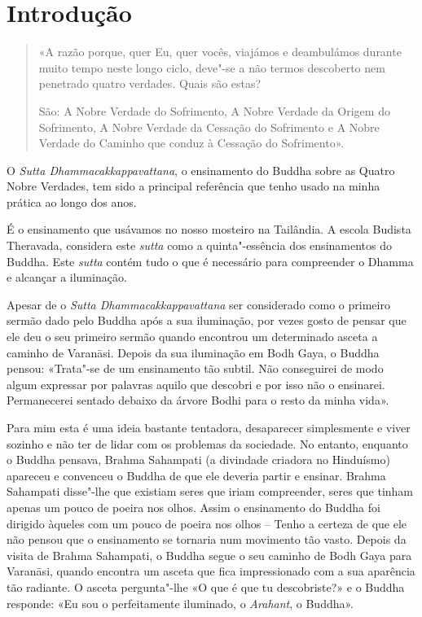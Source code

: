 \chapter{Introdução}

\thispagestyle{bottomcenter}

\begin{quote}
  «A razão porque, quer Eu, quer vocês, viajámos e deambulámos durante muito
  tempo neste longo ciclo, deve"-se a não termos descoberto nem penetrado quatro
  verdades. Quais são estas?

  São: A Nobre Verdade do Sofrimento, A Nobre Verdade da Origem do Sofrimento, A
  Nobre Verdade da Cessação do Sofrimento e A Nobre Verdade do Caminho que conduz
  à Cessação do Sofrimento».

\end{quote}

\noindent
O \emph{Sutta Dhammacakkappavattana}, o ensinamento do Buddha sobre as Quatro
Nobre Verdades, tem sido a principal referência que tenho usado na minha prática
ao longo dos anos.

\enlargethispage{\baselineskip}

É o ensinamento que usávamos no nosso mosteiro na Tailândia.
A escola Budista Theravada, considera este \emph{sutta} como a quinta"-essência
dos ensinamentos do Buddha. Este \emph{sutta} contém tudo o que é necessário
para compreender o Dhamma e alcançar a iluminação.

Apesar de o \emph{Sutta Dhammacakkappavattana} ser considerado como o primeiro
sermão dado pelo Buddha após a sua iluminação, por vezes gosto de pensar que ele
deu o seu primeiro sermão quando encontrou um determinado asceta a caminho de Varanāsi.
Depois da sua iluminação em Bodh Gaya, o Buddha pensou: «Trata"-se de um
ensinamento tão subtil. Não conseguirei de modo algum expressar por palavras
aquilo que descobri e por isso não o ensinarei. Permanecerei sentado debaixo da
árvore Bodhi para o resto da minha vida».

Para mim esta é uma ideia bastante tentadora, desaparecer simplesmente e viver
sozinho e não ter de lidar com os problemas da sociedade. No entanto, enquanto o
Buddha pensava, Brahma Sahampati (a divindade criadora no Hinduísmo) apareceu e
convenceu o Buddha de que ele deveria partir e ensinar. Brahma Sahampati
disse"-lhe que existiam seres que iriam compreender, seres que tinham apenas um pouco
de poeira nos olhos. Assim o ensinamento do Buddha foi dirigido àqueles com um
pouco de poeira nos olhos – Tenho a certeza de que ele não pensou que o
ensinamento se tornaria num movimento tão vasto.
Depois da visita de Brahma Sahampati, o Buddha segue o seu caminho de Bodh Gaya
para Varanāsi, quando encontra um asceta que fica impressionado com a sua
aparência tão radiante. O asceta pergunta"-lhe «O que é que tu descobriste?» e o
Buddha responde: «Eu sou o perfeitamente iluminado, o \emph{Arahant}, o Buddha».

